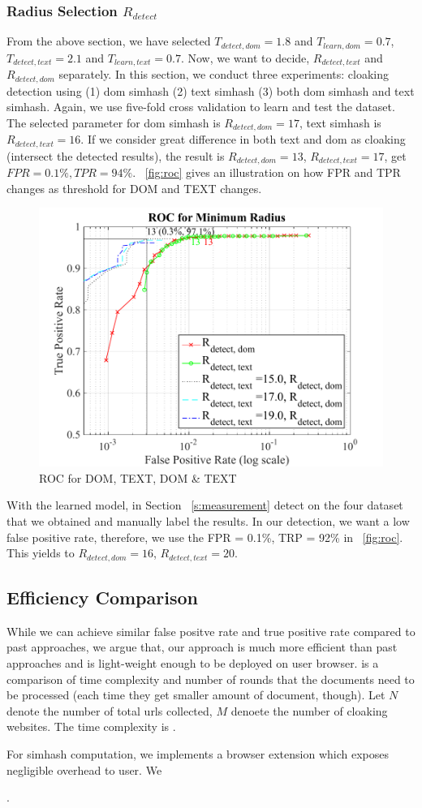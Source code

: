 \subsubsection{Radius Selection $R_{detect}$}
From the above section, we have selected $T_{detect, dom} = 1.8$ and $T_{learn, dom} = 0.7$,
$T_{detect, text} = 2.1$ and $T_{learn, text} = 0.7$. Now, we want to decide,
$R_{detect, text}$ and $R_{detect, dom}$ separately. In this section, we conduct
three experiments: cloaking detection using (1) dom simhash (2) text simhash (3)
both dom simhash and text simhash.
Again, we use five-fold cross validation to learn and test the dataset. The
selected parameter for dom simhash is $R_{detect, dom} = 17$, text simhash is
$R_{detect, text} = 16$. If we consider great difference in both text and dom as
cloaking (intersect the detected results), the result is $R_{detect, dom} = 13$,
$R_{detect, text} = 17$, get $FPR = 0.1\%, TPR = 94\%$.
~\autoref{fig:roc} gives an illustration on how FPR and TPR changes as
threshold for DOM and TEXT changes.

\begin{figure}[t]
  \centering
  \includegraphics[width=.5\textwidth]{fig/roc}
  \caption{ROC for DOM, TEXT, DOM \& TEXT}
  \label{fig:roc}
\end{figure}

With the learned model, in Section ~\autoref{s:measurement} 
detect on the four dataset that we obtained and
manually label the results. In our detection, we want a low false positive rate,
therefore, we use the FPR = 0.1\%, TRP = 92\% in ~\autoref{fig:roc}. This yields
to $R_{detect, dom} = 16$, $R_{detect, text} = 20$.


\subsection{Efficiency Comparison}
\label{ss:efficiency}
While we can achieve similar false positve rate and true positive rate compared
to past approaches, we argue that, our approach is much more efficient than past
approaches and is light-weight enough to be deployed on user browser.
 is a comparison of time complexity and number of rounds that the
documents need to be processed (each time they get smaller amount of document,
though). Let $N$ denote the number of total urls collected, $M$ denoete the
number of cloaking websites. The time complexity is .



For simhash computation, we implements a browser extension which exposes
negligible overhead to user. We 

.




